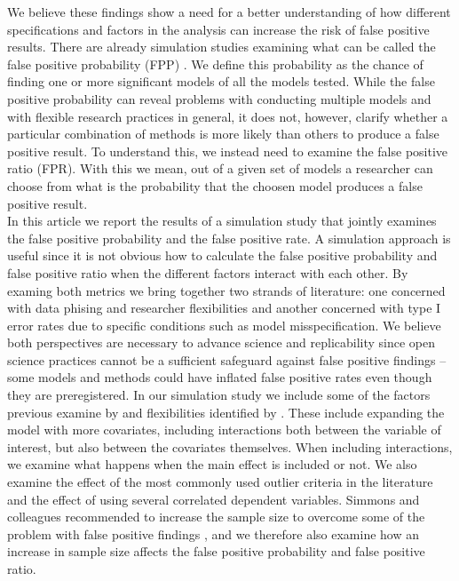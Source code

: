 We believe these findings show a need for a better understanding of how different specifications and factors in the analysis can increase the risk of false positive results. There are already simulation studies examining what can be called the false positive probability (FPP) \citep{Simmons2011}. We define this probability as the chance of finding one or more significant models of all the models tested. While the false positive probability can reveal problems with conducting multiple models and with flexible research practices in general, it does not, however, clarify whether a particular combination of methods is more likely than others to produce a false positive result. To understand this, we instead need to examine the false positive ratio (FPR). With this we mean, out of a given set of models a researcher can choose from what is the probability that the choosen model produces a false positive result. \\

In this article we report the results of a simulation study that jointly examines the false positive probability and the false positive rate. A simulation approach is useful since it is not obvious how to calculate the false positive probability and false positive ratio when the different factors interact with each other. By examing both metrics we bring together two strands of literature: one concerned with data phising and researcher flexibilities and another concerned with type I error rates due to specific conditions such as model misspecification. We believe both perspectives are necessary to advance science and replicability since open science practices cannot be a sufficient safeguard against false positive findings – some models and methods could have inflated false positive rates even though they are preregistered. In our simulation study we include some of the factors previous examine by \cite{Simmons2011} and flexibilities identified by \cite{Wicherts2016}. These include expanding the model with more covariates, including interactions both between the variable of interest, but also between the covariates themselves. When including interactions, we examine what happens when the main effect is included or not. We also examine the effect of the most commonly used outlier criteria in the literature \citep{Leyes2013} and the effect of using several correlated dependent variables. Simmons and colleagues recommended to increase the sample size to overcome some of the problem with false positive findings \citep{Simmons2011}, and we therefore also examine how an increase in sample size affects the false positive probability and false positive ratio. 
